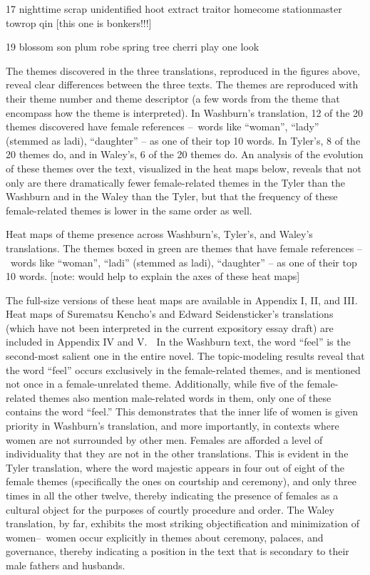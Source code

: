 \documentclass[12pt]{article}
\begin{document}
\begin{flushleft}
\begin{spacing}{2.0}
17 nighttime scrap unidentified hoot extract traitor homecome stationmaster towrop qin [this one is bonkers!!!]

19 blossom son plum robe spring tree cherri play one look 

The themes discovered in the three translations, reproduced in the figures above, reveal clear differences between the three texts. The themes are reproduced with their theme number and theme descriptor (a few words from the theme that encompass how the theme is interpreted). In Washburn’s translation, 12 of the 20 themes discovered have female references – words like “woman”, “lady” (stemmed as ladi), “daughter” – as one of their top 10 words. In Tyler’s, 8 of the 20 themes do, and in Waley’s, 6 of the 20 themes do. An analysis of the evolution of these themes over the text, visualized in the heat maps below, reveals that not only are there dramatically fewer female-related themes in the Tyler than the Washburn and in the Waley than the Tyler, but that the frequency of these female-related themes is lower in the same order as well. 

Heat maps of theme presence across Washburn’s, Tyler’s, and Waley’s translations. The themes boxed in green are themes that have female references – words like “woman”, “ladi” (stemmed as ladi), “daughter” – as one of their top 10 words. [note: would help to explain the axes of these heat maps]

The full-size versions of these heat maps are available in Appendix I, II, and III. Heat maps of Surematsu Kencho’s and Edward Seidensticker’s translations (which have not been interpreted in the current expository essay draft) are included in Appendix IV and V. 
In the Washburn text, the word “feel” is the second-most salient one in the entire novel. The topic-modeling results reveal that the word “feel” occurs exclusively in the female-related themes, and is mentioned not once in a female-unrelated theme. Additionally, while five of the female-related themes also mention male-related words in them, only one of these contains the word “feel.” This demonstrates that the inner life of women is given priority in Washburn’s translation, and more importantly, in contexts where women are not surrounded by other men. Females are afforded a level of individuality that they are not in the other translations. This is evident in the Tyler translation, where the word majestic appears in four out of eight of the female themes (specifically the ones on courtship and ceremony), and only three times in all the other twelve, thereby indicating the presence of females as a cultural object for the purposes of courtly procedure and order. The Waley translation, by far, exhibits the most striking objectification and minimization of women– women occur explicitly in themes about ceremony, palaces, and governance, thereby indicating a position in the text that is secondary to their male fathers and husbands. 


\end{spacing}
\end{flushleft}
\end{document}
